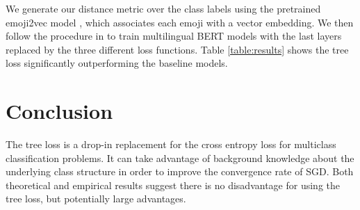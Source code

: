 \documentclass[twoside]{article}
\begin{document}
We generate our distance metric over the class labels using the pretrained emoji2vec model \citep{Eisner2016emoji2vecLE},
which associates each emoji with a vector embedding.
We then follow the procedure in \citet{stoikos2020multilingual} to train multilingual BERT models \citep{Feng2020LanguageagnosticBS} with the last layers replaced by the three different loss functions.
Table \ref{table:results} shows the tree loss significantly outperforming the baseline models.

\section{Conclusion}
The tree loss is a drop-in replacement for the cross entropy loss for multiclass classification problems.
It can take advantage of background knowledge about the underlying class structure in order to improve the convergence rate of SGD.
Both theoretical and empirical results suggest there is no disadvantage for using the tree loss,
but potentially large advantages.



\newpage


\end{document}
